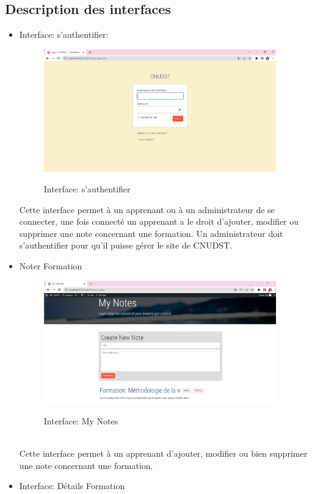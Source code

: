 \subsection{Description des interfaces}
\begin{itemize}
	\item Interface: s'authentifier:
		\begin{figure}[!h]
		\centering
		{\includegraphics[width=0.95\textwidth]{D) IMAGES/interfauth.png}}
		\caption{Interface: s'authentifier }
		\label{Org}
	\end{figure}

Cette interface permet à un apprenant ou à un administrateur de se connecter, une fois connecté un apprenant a le droit d'ajouter, modifier ou supprimer une note concernant une formation. 
Un administrateur doit s'authentifier pour qu'il puisse gérer le site de CNUDST.
\item Noter Formation
\begin{figure}[!h]
	\centering
	{\includegraphics[width=0.95\textwidth]{D) IMAGES/NoteForm.png}}
	\caption{Interface: My Notes}
	\label{Org}
\end{figure}
\\
  Cette interface permet à un apprenant d'ajouter, modifier ou bien supprimer une note concernant une formation.
  \newpage
\item Interface: Détails Formation
  

\end{itemize}
